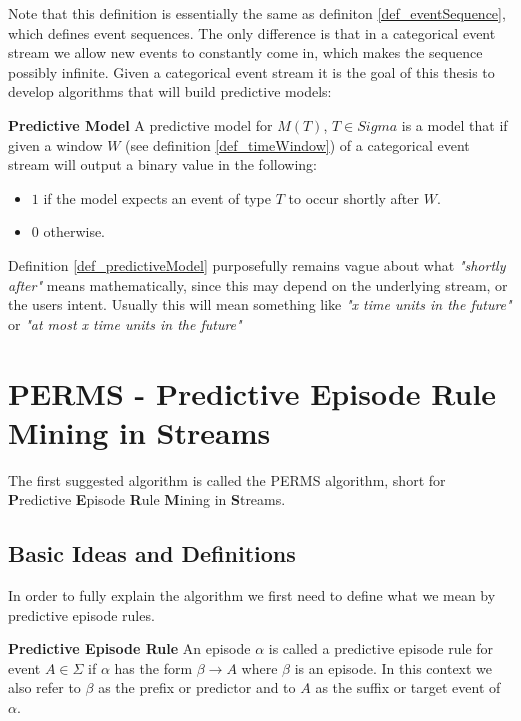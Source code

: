 Note that this definition is essentially the same as definiton \ref{def_eventSequence}, which defines event sequences. The only difference is that in a categorical event stream we allow new events to constantly come in, which makes the sequence possibly infinite. Given a categorical event stream it is the goal of this thesis to develop algorithms that will build predictive models:

\begin{mydef}
\label{def_predictiveModel}
\textbf{Predictive Model} A predictive model for $M(T)$, $T \in Sigma$ is a model that if given a window $W$ (see definition \ref{def_timeWindow}) of a categorical event stream will output a binary value in the following:
\begin{itemize}
	\item $1$ if the model expects an event of type $T$ to occur shortly after $W$.
	\item 0 otherwise.
\end{itemize} 
\end{mydef}

Definition \ref{def_predictiveModel} purposefully remains vague about what \textit{"shortly after"} means mathematically, since this may depend on the underlying stream, or the users intent. Usually this will mean something like \textit{"x time units in the future"} or \textit{"at most x time units in the future"}

\section{PERMS - Predictive Episode Rule Mining in Streams}
\label{sec_predictiveEpisodeMining}
The first suggested algorithm is called the PERMS algorithm, short for \textbf{P}redictive \textbf{E}pisode \textbf{R}ule \textbf{M}ining in \textbf{S}treams.

\subsection{Basic Ideas and Definitions}
In order to fully explain the algorithm we first need to define what we mean by predictive episode rules.

\begin{mydef}
\label{def_predictiveEpisode}
\textbf{Predictive Episode Rule} An episode $\alpha$ is called a predictive episode rule for event $A \in \Sigma$ if $\alpha$ has the form $\beta \rightarrow A$ where $\beta$ is an episode. In this context we also refer to $\beta$ as the prefix or predictor and to $A$ as the suffix or target event of $\alpha$. 
\end{mydef}

